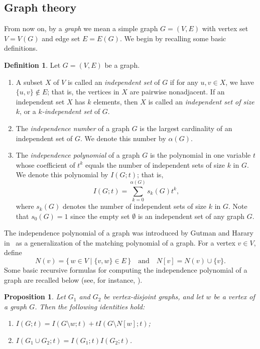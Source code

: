 \documentclass[12pt,twoside]{amsart}
\newtheorem{proposition}[thm]{Proposition}
\theoremstyle{definition}
\newtheorem{definition}[thm]{Definition}
\theoremstyle{mystyle}
\begin{document}
\subsection{Graph theory}

From now on, by a \emph{graph} we mean a simple graph $G = (V, E)$ with vertex set $V = V(G)$ and edge set $E = E(G)$. 
We begin by recalling some basic definitions.

\begin{definition}
	Let $G = (V, E)$ be a graph.
	\begin{enumerate}[\quad \rm (i)]
		\item A subset $X$ of $V$ is called an \emph{independent set} of $G$ if for any $u, v \in X$, we have $\{u, v\} \notin E$; that is, the vertices in $X$ are pairwise nonadjacent. 
		If an independent set $X$ has $k$ elements, then $X$ is called an \emph{independent set of size $k$}, or a \emph{$k$-independent set} of $G$.
		
	
		\item The \emph{independence number} of a graph $G$ is the largest cardinality of an independent set of $G$. 
		We denote this number by $\alpha(G)$.
		
		\item  	The \emph{independence polynomial} of a graph $G$ is the polynomial in one variable $t$ whose coefficient of $t^k$ equals the number of independent sets of size $k$ in $G$. 
		We denote this polynomial by $I(G; t)$; that is,
		\[
		I(G; t) = \sum_{k=0}^{\alpha(G)} s_k(G) t^k,
		\]
		where $s_k(G)$ denotes the number of independent sets of size $k$ in $G$. 
		Note that $s_0(G) = 1$ since the empty set $\emptyset$ is an independent set of any graph $G$.
	\end{enumerate}
\end{definition}



The independence polynomial of a graph was introduced by Gutman and Harary in~\cite{GH83} as a generalization of the matching polynomial of a graph. 
For a vertex $v \in V$, define 
\[
N(v) = \{\, w \in V \mid \{v, w\} \in E \,\}
\quad \text{and} \quad
N[v] = N(v) \cup \{v\}.
\]
Some basic recursive formulas for computing the independence polynomial of a graph are recalled below (see, for instance, \cite{GH83, HL94}).

\begin{proposition}\label{FormulaforIndependence}
	Let $G_1$ and $G_2$ be vertex-disjoint graphs,
	and let $w$ be a vertex of a graph $G$.
	Then the following identities hold:
	\begin{enumerate}[\rm (i)]
		\item
		$I(G;t)=I(G\setminus w;t)
		+tI(G\setminus N[w];t)$;
		\item
		$I(G_1\cup G_2;t)=I(G_1;t)I(G_2;t)$.
	\end{enumerate}
\end{proposition}
\end{document}
